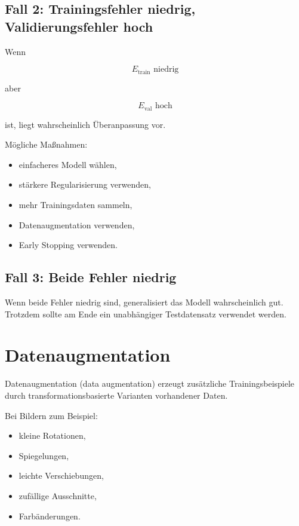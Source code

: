 \subsection{Fall 2: Trainingsfehler niedrig, Validierungsfehler hoch}

Wenn

\[
    E_{\mathrm{train}}
    \text{ niedrig}
\]

aber

\[
    E_{\mathrm{val}}
    \text{ hoch}
\]

ist, liegt wahrscheinlich Überanpassung vor.

Mögliche Maßnahmen:

\begin{itemize}
    \item einfacheres Modell wählen,
    \item stärkere Regularisierung verwenden,
    \item mehr Trainingsdaten sammeln,
    \item Datenaugmentation verwenden,
    \item Early Stopping verwenden.
\end{itemize}

\subsection{Fall 3: Beide Fehler niedrig}

Wenn beide Fehler niedrig sind, generalisiert das Modell wahrscheinlich gut.
Trotzdem sollte am Ende ein unabhängiger Testdatensatz verwendet werden.

\section{Datenaugmentation}

Datenaugmentation (data augmentation) erzeugt zusätzliche Trainingsbeispiele durch transformationsbasierte Varianten vorhandener Daten.

Bei Bildern zum Beispiel:

\begin{itemize}
    \item kleine Rotationen,
    \item Spiegelungen,
    \item leichte Verschiebungen,
    \item zufällige Ausschnitte,
    \item Farbänderungen.
\end{itemize}


